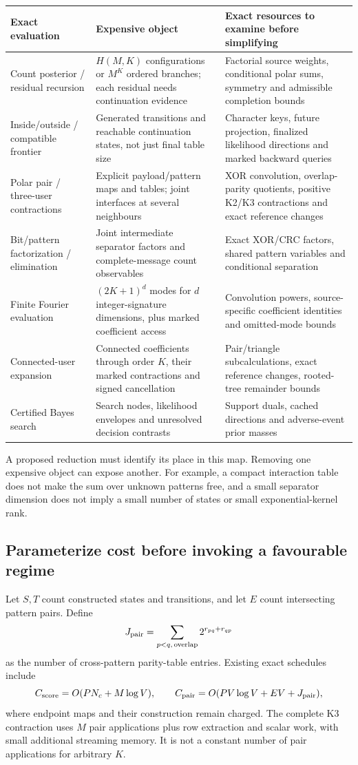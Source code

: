 \documentclass[10pt,a4paper]{article}
\begin{document}
\begin{center}\small
\begin{tabularx}{\textwidth}{@{}>{\raggedright\arraybackslash}p{}YY@{}}\toprule
Exact evaluation & Expensive object & Exact resources to examine before simplifying\\\midrule
Count posterior / residual recursion & $H(M,K)$ configurations or $M^K$ ordered branches; each residual needs continuation evidence & Factorial source weights, conditional polar sums, symmetry and admissible completion bounds\\
Inside/outside / compatible frontier & Generated transitions and reachable continuation states, not just final table size & Character keys, future projection, finalized likelihood directions and marked backward queries\\
Polar pair / three-user contractions & Explicit payload/pattern maps and tables; joint interfaces at several neighbours & XOR convolution, overlap-parity quotients, positive K2/K3 contractions and exact reference changes\\
Bit/pattern factorization / elimination & Joint intermediate separator factors and complete-message count observables & Exact XOR/CRC factors, shared pattern variables and conditional separation\\
Finite Fourier evaluation & $(2K+1)^d$ modes for $d$ integer-signature dimensions, plus marked coefficient access & Convolution powers, source-specific coefficient identities and omitted-mode bounds\\
Connected-user expansion & Connected coefficients through order $K$, their marked contractions and signed cancellation & Pair/triangle subcalculations, exact reference changes, rooted-tree remainder bounds\\
Certified Bayes search & Search nodes, likelihood envelopes and unresolved decision contrasts & Support duals, cached directions and adverse-event prior masses\\\bottomrule
\end{tabularx}
\end{center}
A proposed reduction must identify its place in this map. Removing one expensive object can expose another.
For example, a compact interaction table does not make the sum over unknown patterns free, and a small
separator dimension does not imply a small number of states or small exponential-kernel rank.

\subsection{Parameterize cost before invoking a favourable regime}
Let $S,T$ count constructed states and transitions, and let $E$ count intersecting pattern pairs. Define
\[
 J_{\rm pair}=\sum_{p<q,\,\mathrm{overlap}}2^{r_{pq}+r_{qp}}
\]
as the number of cross-pattern parity-table entries. Existing exact schedules include
\[
 C_{\rm score}=O(PN_c+M\log V),\qquad
 C_{\rm pair}=O(PV\log V+EV+J_{\rm pair}),
\]
where endpoint maps and their construction remain charged. The complete K3 contraction uses $M$ pair
applications plus row extraction and scalar work, with small additional streaming memory. It is not a
constant number of pair applications for arbitrary $K$.
\end{document}
